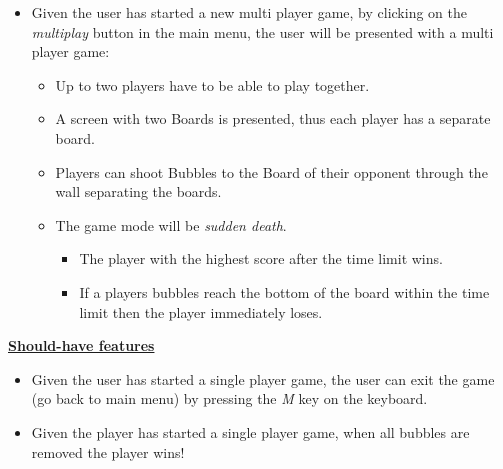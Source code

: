 \documentclass[a4paper,11pt]{article}
\begin{document}
\begin{itemize}
  \item Given the user has started a new multi player game, by clicking on the \textit{multiplay} button in the main menu, the user will be presented with a multi player game:
  \begin{itemize}
    \item Up to two players have to be able to play together.
    \item A screen with two Boards is presented, thus each player has a separate board.
    \item Players can shoot Bubbles to the Board of their opponent
          through the wall separating the boards.
    \item The game mode will be \textit{sudden death}.
    \begin{itemize}
      \item The player with the highest score after the time limit wins.
      \item If a players bubbles reach the bottom of the board within the time limit
            then the player immediately loses.
    \end{itemize}
  \end{itemize}
\end{itemize}

\noindent
\textbf{\underline{Should-have features}}
\begin{itemize}
   \item Given the user has started a single player game,
         the user can exit the game (go back to main menu) by pressing
         the \textit{M} key on the keyboard.
   \item Given the player has started a single player game,
         when all bubbles are removed the player wins!
\end{itemize}
\end{document}
